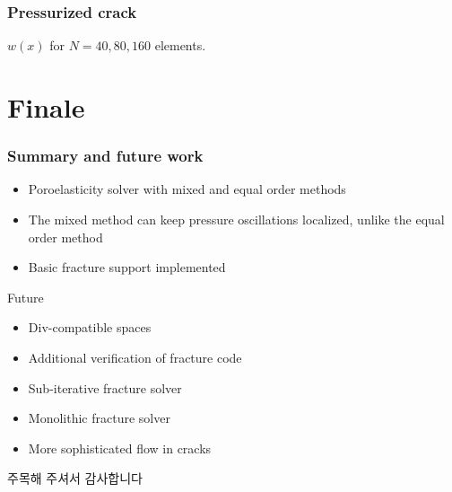 \documentclass{beamer}
\begin{document}
\begin{frame}
  \frametitle{Pressurized crack}

  $w(x)$ for $N=40, 80, 160$ elements.

  \begin{center}
  \end{center}
\end{frame}

\section{Finale}

\begin{frame}
  \frametitle{Summary and future work}

  \begin{itemize}
  \item Poroelasticity solver with mixed and equal order methods
  \item The mixed method can keep pressure oscillations localized, unlike the
    equal order method
  \item Basic fracture support implemented
  \end{itemize}

  Future
  \begin{itemize}
  \item Div-compatible spaces
  \item Additional verification of fracture code
  \item Sub-iterative fracture solver
  \item Monolithic fracture solver
  \item More sophisticated flow in cracks
  \end{itemize}
\end{frame}

\begin{frame}
  \begin{center}
    \begin{CJK}{UTF8}{mj}
      \Large 주목해 주셔서 감사합니다
    \end{CJK}
  \end{center}
\end{frame}
\end{document}
